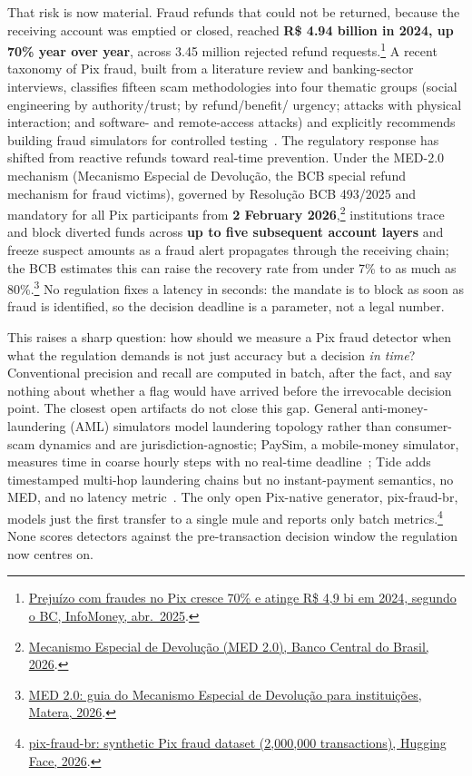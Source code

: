 \documentclass[12pt]{article}
\begin{document}
That risk is now material. Fraud refunds that could not be returned, because
the receiving account was emptied or closed, reached \textbf{R\$ 4.94 billion in
2024, up 70\% year over year}, across 3.45 million rejected refund
requests.\footnote{\href{https://www.infomoney.com.br/minhas-financas/prejuizo-com-fraudes-no-pix-cresce-70-e-atinge-r-49-bi-em-2024-segundo-bc/}{Preju\'izo com fraudes no Pix cresce 70\% e atinge R\$ 4,9 bi em 2024, segundo o BC, InfoMoney, abr.\ 2025}.}
A recent taxonomy of Pix fraud, built from a literature review and
banking-sector interviews, classifies fifteen scam methodologies into four
thematic groups (social engineering by authority/trust; by refund/benefit/
urgency; attacks with physical interaction; and software- and
remote-access attacks) and explicitly recommends building fraud simulators for
controlled testing~\cite{pizzolato2025taxonomy}. The regulatory response has
shifted from reactive refunds toward real-time prevention. Under the MED-2.0
mechanism (Mecanismo Especial de Devolu\c{c}\~ao, the BCB special refund
mechanism for fraud victims), governed by Resolu\c{c}\~ao BCB 493/2025 and
mandatory for all Pix participants from \textbf{2 February
2026},\footnote{\href{https://www.bcb.gov.br/content/estabilidadefinanceira/pix/MED/MED_2-0_Circuito_Pix-Dia_1.pdf}{Mecanismo Especial de Devolu\c{c}\~ao (MED 2.0), Banco Central do Brasil, 2026}.}
institutions trace and block diverted funds across \textbf{up to five subsequent
account layers} and freeze suspect amounts as a fraud alert propagates through
the receiving chain; the BCB estimates this can raise the recovery rate from
under 7\% to as much as 80\%.\footnote{\href{https://www.matera.com/br/blog/med-mecanismo-especial-de-devolucao/}{MED 2.0: guia do Mecanismo Especial de Devolu\c{c}\~ao para institui\c{c}\~oes, Matera, 2026}.}
No regulation fixes a latency in seconds: the mandate is to block as soon as
fraud is identified, so the decision deadline is a parameter, not a legal
number.

This raises a sharp question: how should we measure a Pix fraud detector when
what the regulation demands is not just accuracy but a decision \emph{in time}?
Conventional precision and recall are computed in batch, after the fact, and
say nothing about whether a flag would have arrived before the irrevocable
decision point. The closest open artifacts do not close this gap. General
anti-money-laundering (AML) simulators model laundering topology rather than
consumer-scam dynamics and are jurisdiction-agnostic; PaySim, a mobile-money
simulator, measures time in coarse hourly steps with no real-time
deadline~\cite{lopezrojas2016paysim}; Tide adds timestamped multi-hop laundering
chains but no instant-payment semantics, no MED, and no latency
metric~\cite{vandenbeukel2026tide}. The only open Pix-native generator,
pix-fraud-br, models just the first transfer to a single mule and reports only
batch metrics.\footnote{\href{https://huggingface.co/datasets/andremessina/pix-fraud-br}{pix-fraud-br: synthetic Pix fraud dataset (2{,}000{,}000 transactions), Hugging Face, 2026}.}
None scores detectors against the pre-transaction decision window the
regulation now centres on.
\end{document}
